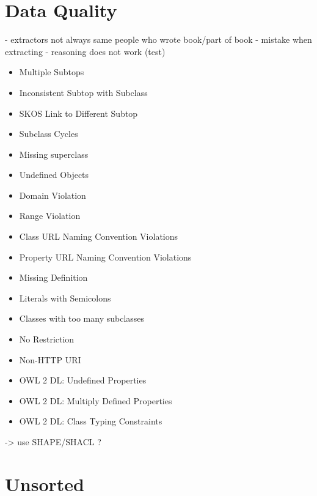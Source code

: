 \documentclass[sw]{iosart2x}
\begin{document}
\section{Data Quality}
- extractors not always same people who wrote book/part of book
- mistake when extracting
- reasoning does not work (test)
\begin{itemize}
\item Multiple Subtops
\item Inconsistent Subtop with Subclass
\item SKOS Link to Different Subtop
\item Subclass Cycles
\item Missing superclass
\item Undefined Objects
\item Domain Violation
\item Range Violation
\item Class URL Naming Convention Violations
\item Property URL Naming Convention Violations
\item Missing Definition
\item Literals with Semicolons
\item Classes with too many subclasses
\item No Restriction
\item Non-HTTP URI
\item OWL 2 DL: Undefined Properties
\item OWL 2 DL: Multiply Defined Properties
\item OWL 2 DL: Class Typing Constraints
\end{itemize}
-> use SHAPE/SHACL ?

\section{Unsorted}
\end{document}

